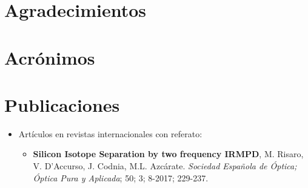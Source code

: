 \documentclass[a4paper,12pt,twoside]{book}
\begin{document}


\chapter*{Agradecimientos}


\chapter*{Acrónimos}


\chapter*{Publicaciones}

\begin{itemize}%
\item {Artículos en revistas internacionales con referato:}

\begin{itemize}%
	
\item \textbf{Silicon Isotope Separation by two frequency IRMPD}, M. Risaro, V. D'Accurso, J. Codnia, M.L. Azc\'arate. 
\textit{Sociedad Española de Óptica; \'Optica Pura y Aplicada}; 50; 3; 8-2017; 229-237.	
	
\end{itemize}

	
	

\end{itemize}

\tableofcontents
\listoffigures
\listoftables

\mainmatter

\end{document}
